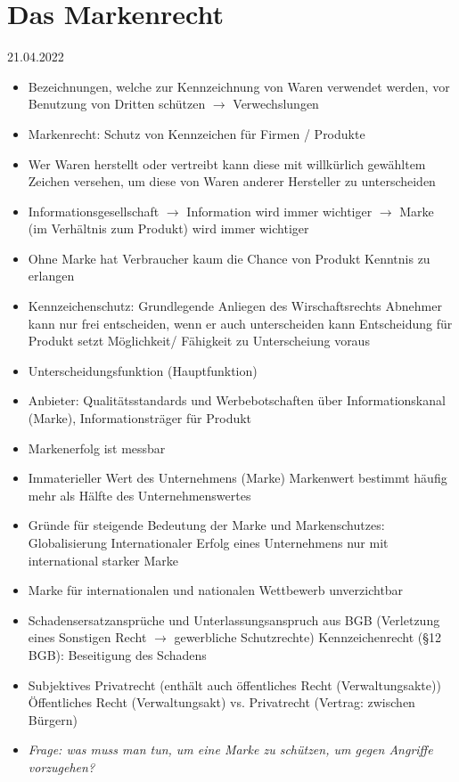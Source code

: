 \documentclass{report}
\begin{document}
\chapter{Das Markenrecht}
21.04.2022
\begin{itemize}
	\item Bezeichnungen, welche zur Kennzeichnung von Waren verwendet werden, vor Benutzung von Dritten schützen $\rightarrow$ Verwechslungen
	\item Markenrecht: Schutz von Kennzeichen für Firmen / Produkte
	\item Wer Waren herstellt oder vertreibt kann diese mit willkürlich gewähltem Zeichen versehen, um diese von Waren anderer Hersteller zu unterscheiden
	\item Informationsgesellschaft $\rightarrow$ Information wird immer wichtiger
	\newline $\rightarrow$ Marke (im Verhältnis zum Produkt) wird immer wichtiger
	\item Ohne Marke hat Verbraucher kaum die Chance von Produkt Kenntnis zu erlangen
	\item Kennzeichenschutz: Grundlegende Anliegen des Wirschaftsrechts
	\newline Abnehmer kann nur frei entscheiden, wenn er auch unterscheiden kann
	\newline Entscheidung für Produkt setzt Möglichkeit/ Fähigkeit zu Unterscheiung voraus
	\item Unterscheidungsfunktion (Hauptfunktion)
	\item Anbieter: Qualitätsstandards und Werbebotschaften über Informationskanal (Marke), Informationsträger für Produkt
	\item Markenerfolg ist messbar
	\item Immaterieller Wert des Unternehmens (Marke)
	\newline Markenwert bestimmt häufig mehr als Hälfte des Unternehmenswertes
	\item Gründe für steigende Bedeutung der Marke und Markenschutzes: Globalisierung
	\newline Internationaler Erfolg eines Unternehmens nur mit international starker Marke
	\item Marke für internationalen und nationalen Wettbewerb unverzichtbar
	\item Schadensersatzansprüche und Unterlassungsanspruch aus BGB
	\newline (Verletzung eines Sonstigen Recht $\rightarrow$ gewerbliche Schutzrechte)
	\newline Kennzeichenrecht (§12 BGB): Beseitigung des Schadens
	\item Subjektives Privatrecht (enthält auch öffentliches Recht (Verwaltungsakte))
	\newline Öffentliches Recht (Verwaltungsakt) vs. Privatrecht (Vertrag: zwischen Bürgern)
	\item \textit{Frage: was muss man tun, um eine Marke zu schützen, um gegen Angriffe vorzugehen?}
\end{itemize}
\end{document}
